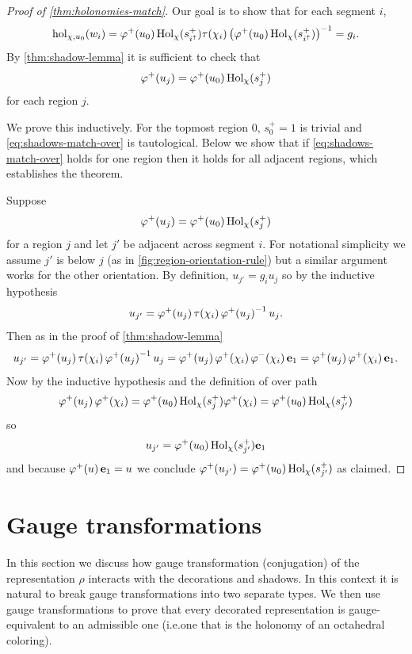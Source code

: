 \documentclass[leqno]{sl2art}
\begin{document}
\begin{proof}[Proof of \cref{thm:holonomies-match}]
  Our goal is to show that for each segment \(i\),
  \[
    \operatorname{hol}_{\chi, u_0}(w_i)
    =
    \varphi^+\mathopen{}\left(u_0\right) \operatorname{Hol}_{\chi}(s_{i^{\uparrow}}^+)
    \tau\mathopen{}\left(\chi_i\right)
    \left( \varphi^+\mathopen{}\left(u_0\right) \operatorname{Hol}_{\chi}(s_{i^{\uparrow}}^+) \right)^{-1}
    =
    g_i.
  \]
  By \cref{thm:shadow-lemma} it is sufficient to check that
  \begin{equation}
    \label{eq:shadows-match-over}
    \varphi^+\mathopen{}\left(u_j\right) = \varphi^+\mathopen{}\left(u_0\right) \operatorname{Hol}_{\chi}(s_j^+) 
  \end{equation}
  for each region \(j\).

  We prove this inductively.
  For the topmost region \(0\), \(s_0^+ = 1\) is trivial and \cref{eq:shadows-match-over} is tautological.
  Below we show that if \cref{eq:shadows-match-over} holds for one region then it holds for all adjacent regions, which establishes the theorem.

  Suppose
  \[
    \varphi^+\mathopen{}\left(u_j\right) = \varphi^+\mathopen{}\left(u_0\right) \operatorname{Hol}_{\chi}(s_j^+) 
  \]
  for a region \(j\) and let  \(j'\) be adjacent across segment \(i\).
  For notational simplicity we assume \(j'\) is below \(j\) (as in \cref{fig:region-orientation-rule}) but a similar argument works for the other orientation.
  By definition,
  \(
    u_{j'} = g_i u_{j}
  \)
  so by the inductive hypothesis
  \[
    u_{j'}
    =
    \varphi^+\mathopen{}\left(u_j\right) \tau\mathopen{}\left(\chi_i\right) \varphi^+\mathopen{}\left(u_j\right)^{-1} u_{j}.
  \]
  Then as in the proof of \cref{thm:shadow-lemma}
  \[
    u_{j'}
    =
    \varphi^+\mathopen{}\left(u_j\right) \tau\mathopen{}\left(\chi_i\right) \varphi^+\mathopen{}\left(u_j\right)^{-1} u_{j}
    =
    \varphi^+\mathopen{}\left(u_j\right) \varphi^+\mathopen{}\left(\chi_i\right) \varphi^-\mathopen{}\left(\chi_i\right) \mathrm{\mathbf{e}}_{1}
    =
    \varphi^+\mathopen{}\left(u_j\right) \varphi^+\mathopen{}\left(\chi_i\right) \mathrm{\mathbf{e}}_{1}.
  \]
  Now by the inductive hypothesis and the definition of over path
  \[
    \varphi^+\mathopen{}\left(u_j\right) \varphi^+\mathopen{}\left(\chi_i\right)
    =
    \varphi^+\mathopen{}\left(u_0\right) \operatorname{Hol}_{\chi}(s_j^+) \varphi^+\mathopen{}\left(\chi_i\right)
    =
    \varphi^+\mathopen{}\left(u_0\right) \operatorname{Hol}_{\chi}(s_{j'}^+) 
  \]
  so
  \[
    u_{j'}
    =
    \varphi^+\mathopen{}\left(u_0\right) \operatorname{Hol}_{\chi}(s_{j'}^+) \mathrm{\mathbf{e}}_{1}
  \]
  and because \(\varphi^+\mathopen{}\left(u\right) \mathrm{\mathbf{e}}_{1} = u\) we conclude \(\varphi^+\mathopen{}\left(u_{j'}\right) = \varphi^+\mathopen{}\left(u_0\right) \operatorname{Hol}_{\chi}(s_{j'}^+)\) as claimed.
\end{proof}

\section{Gauge transformations}
\label{sec:gauge-transformations}

In this section we discuss how gauge transformation (conjugation) of the representation \(\rho\) interacts with the decorations and shadows.
In this context it is natural to break gauge transformations into two separate types.
We then use gauge transformations to prove that every decorated representation is gauge-equivalent to an admissible one (i.e.\@ one that is the holonomy of an octahedral coloring).
\end{document}

